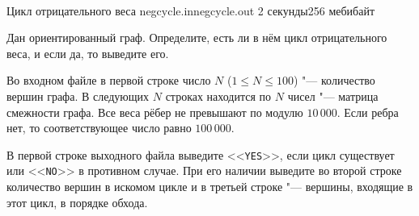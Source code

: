 \begin{problem}{\\ Цикл отрицательного веса}
{negcycle.in}{negcycle.out}
{2 секунды}{256 мебибайт}{}

Дан ориентированный граф.
Определите, есть ли в нём цикл отрицательного веса,
и если да, то выведите его.

\InputFile

Во входном файле в первой строке число $N$ ($1 \le N \le 100$) "---
количество вершин графа.
В следующих $N$ строках находится по $N$ чисел "--- матрица смежности графа.
Все веса рёбер
не превышают по модулю $10\,000$. Если ребра нет, то соответствующее
число равно $100\,000$.

\OutputFile

В первой строке выходного файла выведите <<\texttt{YES}>>,
если цикл существует или <<\texttt{NO}>> в противном случае.
При его наличии выведите во второй строке количество вершин
в искомом цикле и в третьей строке "--- вершины,
входящие в этот цикл, в порядке обхода.

\Example

\begin{example}

%
\end{example}

\end{problem}
